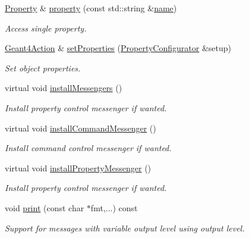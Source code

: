 \begin{DoxyCompactItemize}
\hyperlink{class_d_d4hep_1_1_property}{Property} \& \hyperlink{class_d_d4hep_1_1_simulation_1_1_geant4_action_a7b1a0ac81a980bfa966a972caaaf5bfc}{property} (const std\+::string \&\hyperlink{class_d_d4hep_1_1_simulation_1_1_geant4_action_af374e70b014d16afb81dd9d77cc3894b}{name})
\begin{DoxyCompactList}\small\item\em Access single property. \end{DoxyCompactList}\item 
\hyperlink{class_d_d4hep_1_1_simulation_1_1_geant4_action}{Geant4\+Action} \& \hyperlink{class_d_d4hep_1_1_simulation_1_1_geant4_action_af7cca1826781c1367ecc79c4225e09da}{set\+Properties} (\hyperlink{class_d_d4hep_1_1_property_configurator}{Property\+Configurator} \&setup)
\begin{DoxyCompactList}\small\item\em Set object properties. \end{DoxyCompactList}\item 
virtual void \hyperlink{class_d_d4hep_1_1_simulation_1_1_geant4_action_a82c72e9476d6a5541252edbb93fe69c6}{install\+Messengers} ()
\begin{DoxyCompactList}\small\item\em Install property control messenger if wanted. \end{DoxyCompactList}\item 
virtual void \hyperlink{class_d_d4hep_1_1_simulation_1_1_geant4_action_aaaa0718b7d4f52e4c31e982b91c0eeda}{install\+Command\+Messenger} ()
\begin{DoxyCompactList}\small\item\em Install command control messenger if wanted. \end{DoxyCompactList}\item 
virtual void \hyperlink{class_d_d4hep_1_1_simulation_1_1_geant4_action_a04fb6b6b16ed0aad5f552e04d99d278f}{install\+Property\+Messenger} ()
\begin{DoxyCompactList}\small\item\em Install property control messenger if wanted. \end{DoxyCompactList}\item 
void \hyperlink{class_d_d4hep_1_1_simulation_1_1_geant4_action_a623119a9f20ff7f5a2fb78f4f76b9276}{print} (const char $\ast$fmt,...) const
\begin{DoxyCompactList}\small\item\em Support for messages with variable output level using output level. \end{DoxyCompactList}\item 

\end{DoxyCompactItemize}
